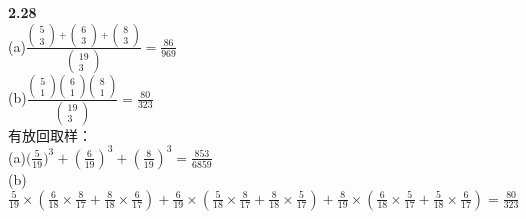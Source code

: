 \documentclass{book}%
\begin{document}
	{\bfseries 2.28}\\
	(a)$\frac{\begin{pmatrix}
			5\\3
		\end{pmatrix}+\begin{pmatrix}
			6\\3
		\end{pmatrix}+\begin{pmatrix}
			8\\3
	\end{pmatrix}}{\begin{pmatrix}
			19\\3
	\end{pmatrix}}=\frac{86}{969}$\\
	(b)$\frac{\begin{pmatrix}
			5\\1
		\end{pmatrix}\begin{pmatrix}
			6\\1
		\end{pmatrix}\begin{pmatrix}
			8\\1
	\end{pmatrix}}{\begin{pmatrix}
			19\\3
	\end{pmatrix}}=\frac{80}{323}$\\
	有放回取样：\\
	(a)${(\frac{5}{19}})^{3}+({\frac{6}{19}})^{3}+({\frac{8}{19}})^{3}=\frac{853}{6859}$\\
	(b)$\frac{5}{19}\times (\frac{6}{18}\times \frac{8}{17}+\frac{8}{18}\times \frac{6}{17})+\frac{6}{19}\times (\frac{5}{18}\times \frac{8}{17}+\frac{8}{18}\times \frac{5}{17})+\frac{8}{19}\times (\frac{6}{18}\times \frac{5}{17}+\frac{5}{18}\times \frac{6}{17})=\frac{80}{323}$
	\\
	~\\
	
\end{document}
